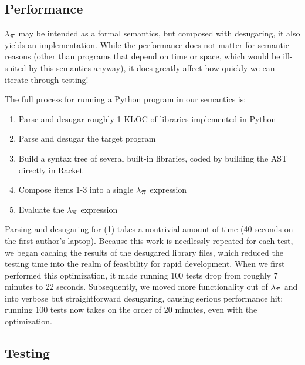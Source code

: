 \documentclass[10pt]{sigplanconf}
\newcommand{\textsub}[1]{$_{\hbox{\textsmaller{#1}}}$}
\newcommand{\Larger}[1]{\textlarger{#1}}
\newlength{\stabLeft}
\newcommand{\atItemizeStart}[0]{\addtolength{\stabLeft}{\labelsep}
                                \addtolength{\stabLeft}{\labelwidth}}
\let\SOriginalthesubsubsection\thesubsubsection
\newcommand{\Ssubsection}[2]{\subsection[#1]{#2}\let\thesubsubsection\SOriginalthesubsubsection}
\begin{document}
\Ssubsection{Performance}{Performance}\label{t:x28part_x22Performancex22x29}

$\lambda$\textsub{\Larger{$\pi$}} may be intended as a formal semantics, but composed with
desugaring, it also yields an implementation. While the performance
does not matter for semantic reasons (other than programs that depend
on time or space, which would be ill{-}suited by this semantics anyway),
it does greatly affect how quickly we can iterate through
testing!

The full process for running a Python program in our semantics is:


\noindent \begin{enumerate}\atItemizeStart

\item Parse and desugar roughly 1 KLOC of libraries implemented in Python

\item Parse and desugar the target program

\item Build a syntax tree of several built{-}in libraries, coded by building the AST directly in Racket

\item Compose items 1{-}3 into a single $\lambda$\textsub{\Larger{$\pi$}} expression

\item Evaluate the $\lambda$\textsub{\Larger{$\pi$}} expression\end{enumerate}

\noindent Parsing and desugaring for (1) takes a nontrivial amount of time (40 seconds on
the first author{'}s laptop).  Because this work is
needlessly repeated for each test, we began caching the results of the
desugared library files, which
reduced the testing time into the realm of feasibility for
rapid development.  When we first performed this optimization, it made
running 100 tests drop from roughly 7 minutes to 22 seconds.  Subsequently,
we moved more functionality out of $\lambda$\textsub{\Larger{$\pi$}} and into verbose but
straightforward
desugaring, causing serious performance hit; running 100 tests now
takes on the order of 20 minutes, even with the optimization.

\Ssubsection{Testing}{Testing}\label{t:x28part_x22Testingx22x29}
\end{document}
